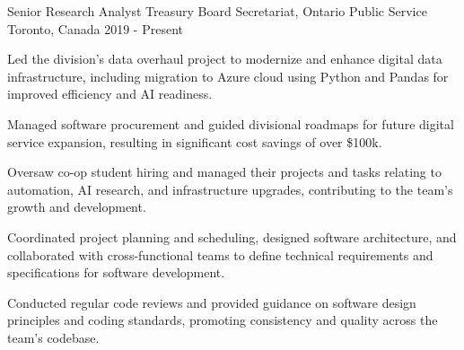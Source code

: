 

\begin{cventries}

  \cventry
    {Senior Research Analyst} %
    {Treasury Board Secretariat, Ontario Public Service} %
    {Toronto, Canada} %
    {2019 - Present} %
    {
      \begin{cvitems} %
        \item{Led the division's data overhaul project to modernize and enhance digital data infrastructure, including migration to Azure cloud using Python and Pandas for improved efficiency and AI readiness.}
        \item{Managed software procurement and guided divisional roadmaps for future digital service expansion, resulting in significant cost savings of over \$100k.}
        \item{Oversaw co-op student hiring and managed their projects and tasks relating to automation, AI research, and infrastructure upgrades, contributing to the team's growth and development.}
        \item{Coordinated project planning and scheduling, designed software architecture, and collaborated with cross-functional teams to define technical requirements and specifications for software development.}
        \item{Conducted regular code reviews and provided guidance on software design principles and coding standards, promoting consistency and quality across the team's codebase.}
      \end{cvitems}
    }


\end{cventries}
